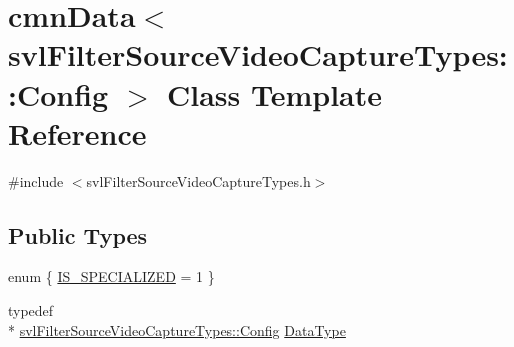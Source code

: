 \hypertarget{classcmn_data_3_01svl_filter_source_video_capture_types_1_1_config_01_4}{\section{cmn\-Data$<$ svl\-Filter\-Source\-Video\-Capture\-Types\-:\-:Config $>$ Class Template Reference}
\label{classcmn_data_3_01svl_filter_source_video_capture_types_1_1_config_01_4}
}


{\ttfamily \#include $<$svl\-Filter\-Source\-Video\-Capture\-Types.\-h$>$}

\subsection*{Public Types}
\begin{DoxyCompactItemize}
\item 
enum \{ \hyperlink{classcmn_data_3_01svl_filter_source_video_capture_types_1_1_config_01_4_a1698b7fd0265afe0ffd08cae3e63fcc5abcffae4188f1c2ab2261eeaa659ca91f}{I\-S\-\_\-\-S\-P\-E\-C\-I\-A\-L\-I\-Z\-E\-D} = 1
 \}
\item 
typedef \\*
\hyperlink{classsvl_filter_source_video_capture_types_1_1_config}{svl\-Filter\-Source\-Video\-Capture\-Types\-::\-Config} \hyperlink{classcmn_data_3_01svl_filter_source_video_capture_types_1_1_config_01_4_aff938e4d56457fbe9133d8b6cbcd5490}{Data\-Type}
\end{DoxyCompactItemize}
